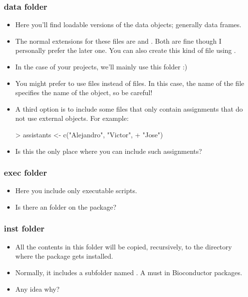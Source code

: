 \begin{frame}
  \frametitle{data folder}
  \begin{itemize}
  \item Here you'll find loadable versions of the data objects; generally data frames. 
  \item The normal extensions for these files are  and . Both are fine though I personally prefer the later one. You can also create this kind of file using .
  \item In the case of your projects, we'll \alert{mainly} use this folder :)
  \item You might prefer to use  files instead of  files. In this case, the name of the file specifies the name of the object, so be careful!
  \item A third option is to include some  files that only contain assignments that do not use external objects. For example:
\begin{Schunk}
\begin{Sinput}
> assistants <- c("Alejandro", "Victor", 
+     "Jose")
\end{Sinput}
\end{Schunk}
  \item Is this the only place where you can include such assignments?
  \end{itemize}
\end{frame}

\begin{frame}[allowframebreaks]
  \frametitle{exec folder}
  \begin{itemize}
  \item Here you include only executable scripts.
  \item Is there an  folder on the  package?
  \end{itemize}
\end{frame}

\begin{frame}[allowframebreaks]
  \frametitle{inst folder}
  \begin{itemize}
  \item All the contents in this folder will be copied, recursively, to the directory where the package gets installed.
  \item Normally, it includes a subfolder named . A must in Bioconductor packages.
  \item Any idea why?
  \end{itemize}
\end{frame}
  
